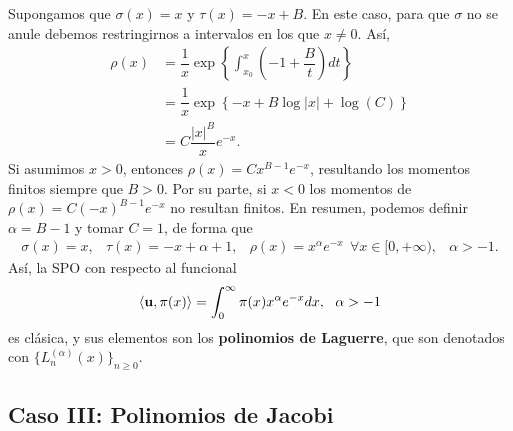 Supongamos que $\sigma(x) = x$ y $\tau(x)=-x+B$. En este caso, para que $\sigma$ no se anule debemos restringirnos a intervalos en los que $x\neq0$. Así,
\begin{equation*}
    \begin{split}
        \rho(x) &= \dfrac 1 x \exp\left\{ \int_{x_0}^x \left(-1+\dfrac B t\right)dt \right\}\\
        &=  \dfrac 1 x \exp\left\{ -x + B\log|x| + \log(C) \right\} \\
        &= C \dfrac{|x|^B}{x}e^{-x}.
    \end{split}
\end{equation*}
Si asumimos $x>0$, entonces $\rho(x)=Cx^{B-1}e^{-x}$, resultando los momentos finitos siempre que $B > 0$. Por su parte, si $x<0$ los momentos de $\rho(x)=C(-x)^{B-1}e^{-x}$ no resultan finitos. En resumen, podemos definir $\alpha=B-1$ y tomar $C=1$, de forma que
\begin{equation}
    \label{eq:parametros-laguerre}
    \begin{array}{cccc}
        \sigma(x)=x, & \tau(x)=-x+\alpha+1, & \rho(x) = x^{\alpha} e^{-x}\ \ \forall x \in[0,+\infty), & \alpha > -1.
    \end{array}
\end{equation}
Así, la SPO con respecto al funcional
\begin{equation}
    \label{eq:func-laguerre}
    \prodesc{\uu}{\pi(x)} = \int_{0}^\infty \pi(x)x^{\alpha} e^{-x}dx, \ \ \alpha > -1
\end{equation}
es clásica, y sus elementos son los \textbf{polinomios de Laguerre}, que son denotados con $\{L_n^{(\alpha)}(x)\}_{n\geq 0}$.

\subsection{Caso III: Polinomios de Jacobi}

